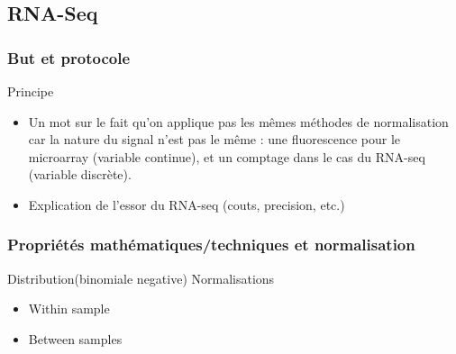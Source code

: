 

\subsection{RNA-Seq}

\subsubsection{But et protocole}

Principe
\begin{itemize}
\item Un mot sur le fait qu'on applique pas les mêmes méthodes de normalisation car la nature du signal n'est pas le même : une fluorescence pour le microarray (variable continue), et un comptage dans le cas du RNA-seq (variable discrète).
\item Explication de l'essor du RNA-seq (couts, precision, etc.)
\end{itemize}

\subsubsection{Propriétés mathématiques/techniques et normalisation}
\label{subsubsection:rnaseq_props_and_normalisation}

Distribution(binomiale negative) %
Normalisations%
\begin{itemize}
    \item Within sample
    \item Between samples
\end{itemize}



